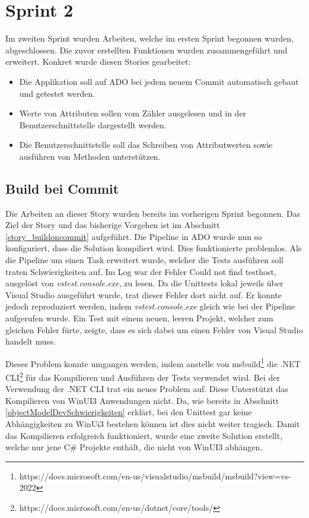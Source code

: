 \section{Sprint 2}
Im zweiten Sprint wurden Arbeiten, welche im ersten Sprint begonnen wurden, abgeschlossen.
Die zuvor erstellten Funktionen wurden zusammengeführt und erweitert.
Konkret wurde diesen Stories gearbeitet:
\begin{itemize}
   \item Die Applikation soll auf \ac{ADO} bei jedem neuem Commit automatisch gebaut und getestet werden. 
   \item Werte von Attributen sollen vom Zähler ausgelesen und in der Benutzerschnittstelle dargestellt werden.
   \item Die Benutzerschnittstelle soll das Schreiben von Attributwerten sowie ausführen von Methoden unterstützen.
\end{itemize}


\subsection{Build bei Commit}\label{s2:buildOnCommit}
Die Arbeiten an dieser Story wurden bereits im vorherigen Sprint begonnen.
Das Ziel der Story und das bisherige Vorgehen ist im Abschnitt \ref{story_buildoncommit} aufgeführt.
Die Pipeline in \ac{ADO} wurde nun so konfiguriert, dass die Solution kompiliert wird.
Dies funktionierte problemlos.
Als die Pipeline um einen Task erweitert wurde, welcher die Tests ausführen soll traten Schwierigkeiten auf.
Im Log war der Fehler \dq  Could not find testhost\dq , ausgelöst von \textit{vstest.console.exe}, zu lesen.
Da die Unittests lokal jeweils über Visual Studio ausgeführt wurde, trat dieser Fehler dort nicht auf.
Er konnte jedoch reproduziert werden, indem \textit{vstest.console.exe} gleich wie bei der Pipeline aufgerufen wurde.
Ein Test mit einem neuen, leeren Projekt, welcher zum gleichen Fehler fürte, zeigte, dass es sich dabei um einen Fehler von Visual Studio handelt muss.

Dieses Problem konnte umgangen werden, indem anstelle von msbuild\footnote{https://docs.microsoft.com/en-us/visualstudio/msbuild/msbuild?view=vs-2022}
die .NET CLI\footnote{https://docs.microsoft.com/en-us/dotnet/core/tools/} für das Kompilieren und Ausführen der Tests verwendet wird.
Bei der Verwendung der .NET CLI trat ein neues Problem auf.
Diese Unterstützt das Kompilieren von WinUI3 Anwendungen nicht.
Da, wie bereits in Abschnitt \ref{objectModelDevSchwierigkeiten} erklärt, bei den Unittest gar keine Abhängigkeiten zu WinUi3 bestehen können ist dies nicht weiter tragisch.
Damit das Kompilieren erfolgreich funktioniert, wurde eine zweite Solution erstellt, welche nur jene C\# Projekte enthält, die nicht von WinUI3 abhängen.

